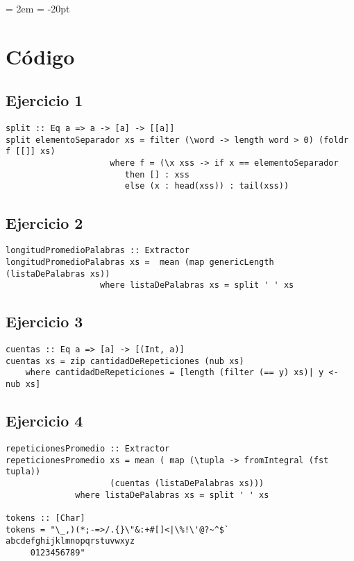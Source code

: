 \documentclass[spanish, 10pt,a4paper]{article}
\numberwithin{equation}{section} %
\begin{document}
{ \oddsidemargin = 2em
	\headheight = -20pt
	\maketitle
}
	\tableofcontents
	\newpage

\section{Código}

\subsection{Ejercicio 1}
\begin{lstlisting}
split :: Eq a => a -> [a] -> [[a]]
split elementoSeparador xs = filter (\word -> length word > 0) (foldr f [[]] xs) 
		             where f = (\x xss -> if x == elementoSeparador 
						then [] : xss 
						else (x : head(xss)) : tail(xss))
\end{lstlisting}

\subsection{Ejercicio 2}

\begin{lstlisting}
longitudPromedioPalabras :: Extractor
longitudPromedioPalabras xs =  mean (map genericLength (listaDePalabras xs)) 
			       where listaDePalabras xs = split ' ' xs
\end{lstlisting}

\subsection{Ejercicio 3}

\begin{lstlisting}
cuentas :: Eq a => [a] -> [(Int, a)]
cuentas xs = zip cantidadDeRepeticiones (nub xs) 
	where cantidadDeRepeticiones = [length (filter (== y) xs)| y <- nub xs]
\end{lstlisting}

\subsection{Ejercicio 4}

\begin{lstlisting}
repeticionesPromedio :: Extractor
repeticionesPromedio xs = mean ( map (\tupla -> fromIntegral (fst tupla)) 
				     (cuentas (listaDePalabras xs))) 
			  where listaDePalabras xs = split ' ' xs 

tokens :: [Char]
tokens = "\_,)(*;-=>/.{}\"&:+#[]<|\%!\'@?~^$` abcdefghijklmnopqrstuvwxyz
	 0123456789"
\end{lstlisting}
\end{document}
